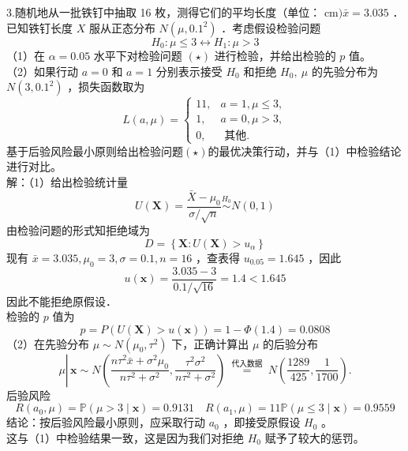 \documentclass[UTF8]{ctexart}
\begin{document}
\noindent 3.随机地从一批铁钉中抽取 16 枚，测得它们的平均长度（单位： cm$) \bar{x}=3.035$ ．已知铁钉长度 $X$ 服从正态分布 $N\left(\mu, 0.1^2\right)$ ．考虑假设检验问题
\begin{equation}
	H_0: \mu \leq 3 \longleftrightarrow H_1: \mu > 3 \tag{$\star$}
\end{equation}
（1）在 $\alpha=0.05$ 水平下对检验问题 $(\star)$ 进行检验，并给出检验的 $p$ 值。\\
（2）如果行动 $a=0$ 和 $a=1$ 分别表示接受 $H_0$ 和拒绝 $H_0, ~ \mu$ 的先验分布为 $N\left(3,0.1^2\right)$ ，损失函数取为
$$
L(a, \mu)= \begin{cases}11, & a=1, \mu \leq 3, \\ 1, & a=0, \mu>3, \\ 0, & \text { 其他. }\end{cases}
$$
基于后验风险最小原则给出检验问题$(\star)$的最优决策行动，并与（1）中检验结论进行对比。\\
解：（1）给出检验统计量
$$U(\boldsymbol{X})=\frac{\bar{X}-\mu_0}{\sigma / \sqrt{n}} \stackrel{H_0}{\sim} N(0,1)$$
由检验问题的形式知拒绝域为 
$$D=\left\{\boldsymbol{X}: U(\boldsymbol{X})>u_\alpha\right\}$$
现有 $\bar{x}=3.035, \mu_0=3, \sigma=0.1, n=16$ ，查表得 $u_{0.05}=1.645$ ，因此
$$
u(\boldsymbol{x})=\frac{3.035-3}{0.1 / \sqrt{16}}=1.4<1.645
$$
因此不能拒绝原假设．\\
检验的 $p$ 值为 $$p=P(U(\boldsymbol{X})>u(\boldsymbol{x}))=1-\Phi(1.4)=0.0808$$
（2）在先验分布 $\mu \sim N\left(\mu_0, \tau^2\right)$ 下，正确计算出 $\mu$ 的后验分布
$$
\mu \left\lvert\, \boldsymbol{x} \sim N\left(\frac{n \tau^2 \bar{x}+\sigma^2 \mu_0}{n \tau^2+\sigma^2}, \frac{\tau^2 \sigma^2}{n \tau^2+\sigma^2}\right) \stackrel{\text { 代入数据 }}{=} N\left(\frac{1289}{425}, \frac{1}{1700}\right) .\right.
$$
后验风险 
$$R\left(a_0, \mu\right)=\mathbb{P}(\mu>3 \mid \boldsymbol{x})=0.9131\quad R\left(a_1, \mu\right)=11 \mathbb{P}(\mu \leq 3 \mid \boldsymbol{x})=0.9559$$
结论：按后验风险最小原则，应采取行动 $a_0$ ，即接受原假设 $H_0$ 。\\
这与（1）中检验结果一致，这是因为我们对拒绝 $H_0$ 赋予了较大的惩罚。\\
\end{document}
